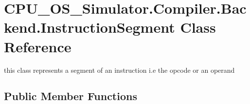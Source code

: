 \hypertarget{class_c_p_u___o_s___simulator_1_1_compiler_1_1_backend_1_1_instruction_segment}{}\section{C\+P\+U\+\_\+\+O\+S\+\_\+\+Simulator.\+Compiler.\+Backend.\+Instruction\+Segment Class Reference}
\label{class_c_p_u___o_s___simulator_1_1_compiler_1_1_backend_1_1_instruction_segment}


this class represents a segment of an instruction i.\+e the opcode or an operand  


\subsection*{Public Member Functions}
